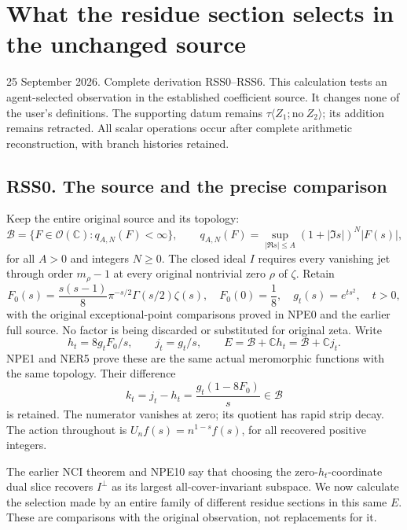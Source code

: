 \section{What the residue section selects in the unchanged
source}\label{what-the-residue-section-selects-in-the-unchanged-source}

25 September 2026. Complete derivation RSS0--RSS6. This calculation
tests an agent-selected observation in the established coefficient
source. It changes none of the user's definitions. The supporting datum
remains \(\tau\langle Z_1;\mathrm{no}\ Z_2\rangle\); its addition
remains retracted. All scalar operations occur after complete arithmetic
reconstruction, with branch histories retained.

\subsection{RSS0. The source and the precise
comparison}\label{rss0.-the-source-and-the-precise-comparison}

Keep the entire original source and its topology: \[
\mathcal B=\{F\in\mathcal O(\mathbb C):q_{A,N}(F)<\infty\},\qquad
q_{A,N}(F)=\sup_{|\Re s|\le A}(1+|\Im s|)^N|F(s)|,
\tag{RSS0.1}
\] for all \(A>0\) and integers \(N\ge0\). The closed ideal \(I\)
requires every vanishing jet through order \(m_\rho-1\) at every
original nontrivial zero \(\rho\) of \(\zeta\). Retain \[
F_0(s)=\frac{s(s-1)}8\pi^{-s/2}\Gamma(s/2)\zeta(s),\quad
F_0(0)=\frac18,\quad g_t(s)=e^{ts^2},\quad t>0,
\tag{RSS0.2}
\] with the original exceptional-point comparisons proved in NPE0 and
the earlier full source. No factor is being discarded or substituted for
original zeta. Write \[
h_t=8g_tF_0/s,\qquad j_t=g_t/s,\qquad
E=\mathcal B+\mathbb C h_t=\mathcal B+\mathbb C j_t.
\tag{RSS0.3}
\] NPE1 and NER5 prove these are the same actual meromorphic functions
with the same topology. Their difference \[
k_t=j_t-h_t=\frac{g_t(1-8F_0)}s\in\mathcal B
\tag{RSS0.4}
\] is retained. The numerator vanishes at zero; its quotient has rapid
strip decay. The action throughout is \(U_n f(s)=n^{1-s}f(s)\), for all
recovered positive integers.

The earlier NCI theorem and NPE10 say that choosing the
zero-\(h_t\)-coordinate dual slice recovers \(I^\perp\) as its largest
all-cover-invariant subspace. We now calculate the selection made by an
entire family of different residue sections in this same \(E\). These
are comparisons with the original observation, not replacements for it.


